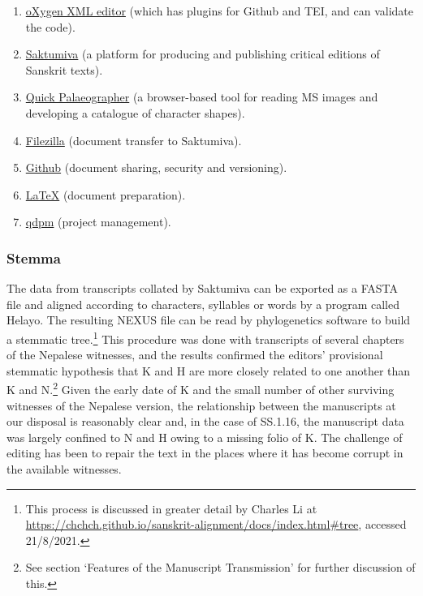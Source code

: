 \begin{enumerate}
    \item
    \href{https://www.oxygenxml.com.}{oXygen XML editor} (which has plugins for Github and TEI, and can validate the code).%
    
       \item
        \href{http://saktumiva.org.}{Saktumiva} (a platform for producing and publishing critical editions of Sanskrit texts).%
        \item
         \href{https://tst.hypotheses.org/1738.}{Quick Palaeographer} (a browser-based tool for reading MS images and developing a catalogue of character shapes).%

        \item
         \href{https://filezilla-project.org.}{Filezilla} (document transfer to Saktumiva).%
        \item
         \href{https://github.com.}{Github} (document sharing, security and versioning).%
        \item
          \href{https://www.latex-project.org.}{LaTeX} (document preparation).%
         \item
           \href{https://qdpm.net.}{qdpm} (project management).%
          
\end{enumerate}

\subsubsection{Stemma}
The data from transcripts collated by Saktumiva can be exported as a FASTA file 
and aligned according to characters, syllables or words by a program called 
Helayo. The resulting NEXUS file can be read by phylogenetics software to build a 
stemmatic tree.\footnote{This process is discussed in greater detail by Charles Li 
at \url{https://chchch.github.io/sanskrit-alignment/docs/index.html\#tree}, 
accessed 21/8/2021.} This procedure was done with transcripts of several 
chapters of the Nepalese witnesses, and the results confirmed the editors' provisional stemmatic hypothesis that 
K and H are more closely related to one another than K and N.\footnote{See 
section `Features of the Manuscript Transmission' for further discussion of this.} 
Given the early date of K and the small number of other surviving witnesses of the 
Nepalese version, the relationship between the manuscripts at our disposal is 
reasonably clear and, in the case of SS.1.16, the manuscript data was largely 
confined to N and H owing to a missing folio of K. The challenge of editing has 
been to repair the text in the places where it has become corrupt in the
available witnesses. 

